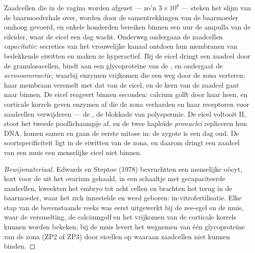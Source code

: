 \begin{proposition}\label{prop:b2:mammal-reproduction:fertilisation}
Zaadcellen die in de vagina worden afgezet --- zo'n $3\times 10^{8}$ ---
steken het slijm van de baarmoederhals over, worden door de samentrekkingen
van de baarmoeder omhoog gevoerd, en enkele honderden bereiken binnen een
uur de ampulla van de eileider, waar de eicel een dag wacht. Onderweg
ondergaan de zaadcellen \emph{capacitatie}: secreties van het
vrouwelijke kanaal ontdoen hun membranen van bedekkende eiwitten en maken
ze hyperactief. Bij de eicel dringt een zaadcel door de granulosacellen,
bindt aan een glycoproteïne van de \emph{}, en ondergaat de
\emph{acrosoomreactie}, waarbij enzymen vrijkomen die een weg door de zona
verteren; haar membraan versmelt met dat van de eicel, en de kern van de
zaadcel gaat naar binnen. De eicel reageert binnen seconden: calcium
golft door haar heen, en corticale korrels geven enzymen af die de zona
verharden en haar receptoren voor zaadcellen verwijderen --- de
\emph{}, de blokkade van polyspermie.
De eicel voltooit  II, stoot het tweede poollichaampje af, en de
twee haploïde \emph{pronuclei} repliceren hun DNA, komen samen en gaan de
eerste mitose in: de zygote is een dag oud. De soortspecificiteit ligt in
de eiwitten van de zona, en daarom dringt een zaadcel van een muis een
menselijke eicel niet binnen.
\end{proposition}
\begin{proof}[Bewijsmateriaal]
Edwards en Steptoe (1978) bevruchtten een menselijke oöcyt, kort voor de
 uit het ovarium gehaald, in een schaaltje met gecapaciteerde
zaadcellen, kweekten het embryo tot acht cellen en brachten het terug in
de baarmoeder, waar het zich innestelde en werd geboren: in-vitrofertilisatie.
Elke stap van de bovenstaande reeks was eerst uitgewerkt bij de zee-egel en
de muis, waar de versmelting, de calciumgolf en het vrijkomen van de
corticale korrels kunnen worden bekeken; bij de muis levert het
wegnemen van één glycoproteïne van de zona (ZP2 of ZP3) door 
eicellen op waaraan zaadcellen niet kunnen binden.
\end{proof}


